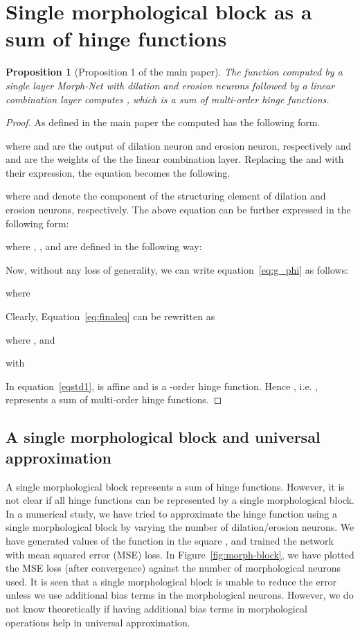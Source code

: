 \documentclass[12pt]{article}
\def\eqref#1{equation~\ref{#1}}
\newtheorem{proposition}{Proposition}
\begin{document}
\section{Single morphological block as a sum of hinge functions}
\label{sec:proof_lemma1}
\begin{proposition}[Proposition 1 of the main paper]
\label{th:gx_sum_hinge}
The function computed by a single layer Morph-Net with  dilation and  erosion neurons followed by a linear combination layer computes , which is a sum of multi-order hinge functions.
\end{proposition}
\begin{proof}
As defined in the main paper the computed  has the following form.

where  and  are the output of  dilation neuron and  erosion neuron, respectively and  and  are the weights of the the linear combination layer. Replacing the  and  with their expression, the equation becomes the following.

where  and  denote the  component of the  structuring element of dilation and erosion neurons, respectively. The above equation can be further expressed in the following form:

where , ,  and  are defined in the following way:


Now, without any loss of generality, we can write \eqref{eq:g_phi} as follows:

where 

Clearly, Equation~\ref{eq:finaleq} can be rewritten as 

where ,  and
 
with

In \eqref{eqstd1},  is affine and  is a -order hinge function. Hence , i.e. , represents a sum of multi-order hinge functions. 
\end{proof}

\subsection{A single morphological block and universal approximation}
A single morphological block represents a sum of hinge functions. However, it is not clear if all hinge functions can be represented by a single morphological block. 
In a numerical study, we have tried to approximate the hinge function  using a single morphological block by varying the number of dilation/erosion neurons. We have generated values of the function in the square , and trained the network with mean squared error (MSE) loss. In  Figure~\ref{fig:morph-block}, we have plotted the MSE loss (after convergence) against the number of morphological neurons used. It is seen that a single morphological block is unable to reduce the error unless we use additional bias terms in the morphological neurons. However, we do not know theoretically if having additional bias terms in morphological operations help in universal approximation.
\end{document}
